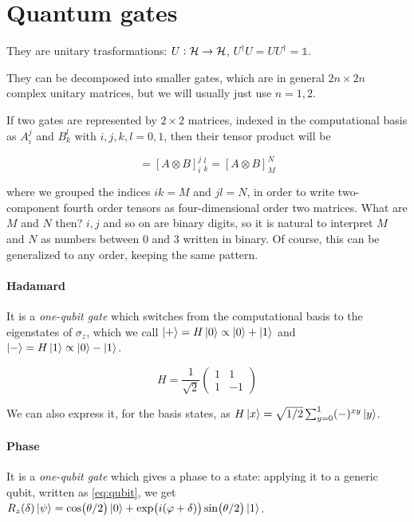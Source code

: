\documentclass[main.tex]{subfiles}
\begin{document}
\section{Quantum gates}
They are unitary trasformations: \(U: \mathcal{H} \rightarrow \mathcal{H}\), \(U ^\dag U = UU^\dag= \mathbb{1}\).

They can be decomposed into smaller gates, which are in general \(2n \times 2n\) complex unitary matrices, but we will usually just use \(n=1, 2\).

If two gates are represented by \(2 \times 2\) matrices, indexed in the computational basis as \(A_i ^j\) and \(B_k^l\) with \(i, j, k, l = 0,1\),  then their tensor product will be

\begin{equation}
    [A_i^j B_k^l] = [A \otimes B]_i^j\,_k^l = [A \otimes B ] _M ^N
\end{equation}

where we grouped the indices \(ik = M\) and \(jl=N\), in order to write two-component fourth order tensors as four-dimensional order two matrices. What are \(M\) and \(N\)  then? \(i, j\) and so on are binary digits, so it is natural to interpret \(M\) and \(N\) as numbers between \(0\) and \(3\) written in binary.
Of course, this can be generalized to any order, keeping the same pattern.

\paragraph{Hadamard} \label{par:hadamard}
It is a \emph{one-qubit gate} which switches from the computational basis to the eigenstates of \(\sigma_z\), which we call \(\ket{+} = H \ket{0} \propto \ket{0} +\ket{1}   \) and \(\ket{-} = H \ket{1} \propto \ket{0} - \ket{1} \).

\begin{equation}
    H = \frac{1}{\sqrt{2} } \begin{pmatrix}
    1   & 1 \\
    1   & -1
    \end{pmatrix}
\end{equation}

We can also express it, for the basis states, as \(H \ket{x} = \sqrt{1/2} \sum _{y=0}^1 (-)^{xy} \ket{y}  \).

\paragraph{Phase}
It is a \emph{one-qubit gate} which  gives a phase to a state: applying it to a generic qubit, written as \eqref{eq:qubit}, we get \(R_z(\delta) \ket{\psi} =  \cos(\theta/2) \ket{0} + \exp(i(\varphi+\delta)) \sin(\theta/2)\ket{1}\).
\end{document}
